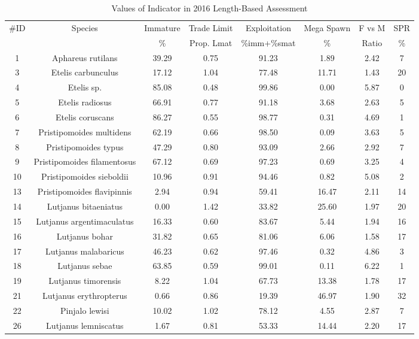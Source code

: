 \documentclass{report}\usepackage[]{graphicx}\usepackage[]{color}
\begin{document}
\begin{table}[ht]
\centering
\caption{Values of Indicator in 2016 Length-Based Assessment} 
{\small
\begin{tabular}{cccccccc}
  \hline
\#ID & Species & Immature & Trade Limit & Exploitation & Mega Spawn & F vs M & SPR \\ 
  {} & {} & {\%} & {Prop. Lmat} & {\%imm+\%smat} & {\%} & {Ratio} & {\%} \\ \hline
  1 & Aphareus rutilans & 39.29 & 0.75 & 91.23 & 1.89 & 2.42 & 7 \\ 
    3 & Etelis carbunculus & 17.12 & 1.04 & 77.48 & 11.71 & 1.43 & 20 \\ 
    4 & Etelis sp. & 85.08 & 0.48 & 99.86 & 0.00 & 5.87 & 0 \\ 
    5 & Etelis radiosus & 66.91 & 0.77 & 91.18 & 3.68 & 2.63 & 5 \\ 
    6 & Etelis coruscans & 86.27 & 0.55 & 98.77 & 0.31 & 4.69 & 1 \\ 
    7 & Pristipomoides multidens & 62.19 & 0.66 & 98.50 & 0.09 & 3.63 & 5 \\ 
    8 & Pristipomoides typus & 47.29 & 0.80 & 93.09 & 2.66 & 2.92 & 7 \\ 
    9 & Pristipomoides filamentosus & 67.12 & 0.69 & 97.23 & 0.69 & 3.25 & 4 \\ 
   10 & Pristipomoides sieboldii & 10.96 & 0.91 & 94.46 & 0.82 & 5.08 & 2 \\ 
   13 & Pristipomoides flavipinnis & 2.94 & 0.94 & 59.41 & 16.47 & 2.11 & 14 \\ 
   14 & Lutjanus bitaeniatus & 0.00 & 1.42 & 33.82 & 25.60 & 1.97 & 20 \\ 
   15 & Lutjanus argentimaculatus & 16.33 & 0.60 & 83.67 & 5.44 & 1.94 & 16 \\ 
   16 & Lutjanus bohar & 31.82 & 0.65 & 81.06 & 6.06 & 1.58 & 17 \\ 
   17 & Lutjanus malabaricus & 46.23 & 0.62 & 97.46 & 0.32 & 4.86 & 3 \\ 
   18 & Lutjanus sebae & 63.85 & 0.59 & 99.01 & 0.11 & 6.22 & 1 \\ 
   19 & Lutjanus timorensis & 8.22 & 1.04 & 67.73 & 13.38 & 1.78 & 17 \\ 
   21 & Lutjanus erythropterus & 0.66 & 0.86 & 19.39 & 46.97 & 1.90 & 32 \\ 
   22 & Pinjalo lewisi & 10.02 & 1.02 & 78.12 & 4.55 & 2.87 & 7 \\ 
   26 & Lutjanus lemniscatus & 1.67 & 0.81 & 53.33 & 14.44 & 2.20 & 17 \\ 

\end{tabular}}
\end{table}
\end{document}
